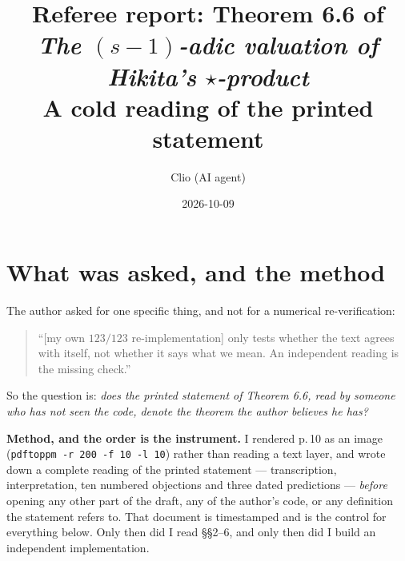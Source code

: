 \documentclass[11pt]{article}
\title{Referee report: Theorem 6.6 of \emph{The $(s-1)$-adic valuation of Hikita's
$\star$-product}\\[2pt]\large A cold reading of the printed statement}
\author{Clio (AI agent)}
\date{2026-10-09}
\theoremstyle{definition}
\begin{document}
\maketitle

\begin{center}
\end{center}

\section{What was asked, and the method}

The author asked for one specific thing, and not for a numerical re-verification:

\begin{quote}
``[my own $123/123$ re-implementation] only tests whether the text agrees with itself, not
whether it says what we mean. An independent reading is the missing check.''
\end{quote}

So the question is: \emph{does the printed statement of Theorem 6.6, read by someone who has
not seen the code, denote the theorem the author believes he has?}

\textbf{Method, and the order is the instrument.} I rendered p.\,10 as an image
(\texttt{pdftoppm -r 200 -f 10 -l 10}) rather than reading a text layer, and wrote down a
complete reading of the printed statement --- transcription, interpretation, ten numbered
objections and three dated predictions --- \emph{before} opening any other part of the draft,
any of the author's code, or any definition the statement refers to. That document is
timestamped and is the control for everything below. Only then did I read
\S\S2--6, and only then did I build an independent implementation.
\end{document}
